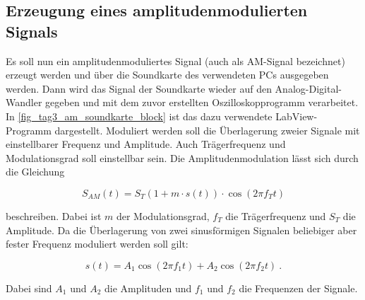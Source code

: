 \documentclass[
a4paper,
12pt,
pagesize,
ngerman
]{scrartcl}
\begin{document}
	\subsection{Erzeugung eines amplitudenmodulierten Signals} \label{AMSignalErzeugung}
	
	Es soll nun ein amplitudenmoduliertes Signal (auch als AM-Signal bezeichnet) erzeugt werden und über die Soundkarte des verwendeten PCs ausgegeben werden.
	Dann wird das Signal der Soundkarte wieder auf den Analog-Digital-Wandler gegeben und mit dem zuvor erstellten Oszilloskopprogramm verarbeitet.
	In \cref{fig_tag3_am_soundkarte_block} ist das dazu verwendete LabView-Programm dargestellt.
	Moduliert werden soll die Überlagerung zweier Signale mit einstellbarer Frequenz und Amplitude.
	Auch Trägerfrequenz und Modulationsgrad soll einstellbar sein.
	Die Amplitudenmodulation lässt sich durch die Gleichung
	
	\begin{equation} \label{AMFormel}
		S_{AM}(t)=S_T (1+m \cdot s(t)) \cdot \cos(2\pi f_T t)
	\end{equation}
	
	\noindent beschreiben.
	Dabei ist $m$ der Modulationsgrad, $f_T$ die Trägerfrequenz und $S_T$ die Amplitude.
	Da die Überlagerung von zwei sinusförmigen Signalen beliebiger aber fester Frequenz moduliert werden soll gilt:
	
	\begin{equation} \label{Ursprungssignal}
		s(t) = A_1 \cos (2\pi f_1 t) + A_2 \cos (2\pi f_2 t) \ . 
	\end{equation}
	
	\noindent Dabei sind $A_1$ und $A_2$ die Amplituden und $f_1$ und $f_2$ die Frequenzen der Signale.
	
\end{document}
